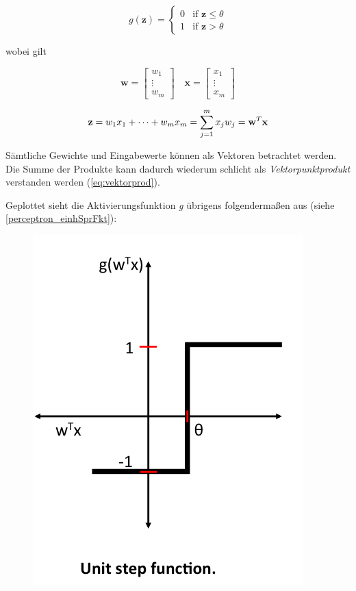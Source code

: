 \begin{equation} \label{eq:aktFkt}
g(\mathbf{z}) =\begin{cases}
	0 & \mbox{if } \mathbf{z} \leq \theta \\
    1 & \mbox{if } \mathbf{z} > \theta
  \end{cases}
\end{equation}

wobei gilt 

\begin{equation} \label{eq:vektorprod}
\mathbf{w} = \begin{bmatrix}
    w_{1}  \\
    \vdots \\
    w_{m}
\end{bmatrix}
\quad  \mathbf{x} = \begin{bmatrix}
    x_{1}  \\
    \vdots \\
    x_{m}
\end{bmatrix}
\end{equation}

\begin{equation}
\mathbf{z} =  w_1x_{1} + \dots + w_mx_{m} = \sum_{j=1}^{m} x_{j}w_{j} \\ = \mathbf{w}^T\mathbf{x}
\end{equation}

Sämtliche Gewichte und Eingabewerte können als Vektoren betrachtet werden. Die Summe der Produkte kann dadurch wiederum schlicht als \emph{Vektorpunktprodukt} verstanden werden (\ref{eq:vektorprod}).

Geplottet sieht die Aktivierungsfunktion \emph{g} übrigens folgendermaßen aus (siehe \ref{perceptron_einhSprFkt}): 

\begin{figure}[!htb]
	\centering
	\includegraphics[width=.3\linewidth]{./img/perceptron_einheitsSprungfunktion}
	\label{fig:perceptron_einhSprFkt}
\end{figure}

